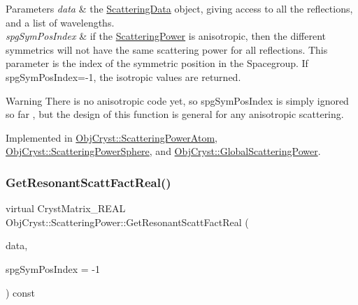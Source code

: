 \begin{DoxyParams}{Parameters}
{\em data} & the \mbox{\hyperlink{class_obj_cryst_1_1_scattering_data}{Scattering\+Data}} object, giving access to all the reflections, and a list of wavelengths. \\
\hline
{\em spg\+Sym\+Pos\+Index} & if the \mbox{\hyperlink{class_obj_cryst_1_1_scattering_power}{Scattering\+Power}} is anisotropic, then the different symmetrics will not have the same scattering power for all reflections. This parameter is the index of the symmetric position in the Spacegroup. If spg\+Sym\+Pos\+Index=-\/1, the isotropic values are returned. \\
\hline
\end{DoxyParams}
\begin{DoxyWarning}{Warning}
There is no anisotropic code yet, so spg\+Sym\+Pos\+Index is simply ignored so far , but the design of this function is general for any anisotropic scattering. 
\end{DoxyWarning}


Implemented in \mbox{\hyperlink{class_obj_cryst_1_1_scattering_power_atom_a42db6378fdd8e3fbfae31b3f4dd5bb17}{Obj\+Cryst\+::\+Scattering\+Power\+Atom}}, \mbox{\hyperlink{class_obj_cryst_1_1_scattering_power_sphere_a66b0eb24b24b92e6bbdf677c53853aad}{Obj\+Cryst\+::\+Scattering\+Power\+Sphere}}, and \mbox{\hyperlink{class_obj_cryst_1_1_global_scattering_power_af570597de2c717e60b63507745e32e32}{Obj\+Cryst\+::\+Global\+Scattering\+Power}}.

\mbox{\label{class_obj_cryst_1_1_scattering_power_a42c1302254787d13b9e0f2210315291a}} 
\subsubsection{\texorpdfstring{GetResonantScattFactReal()}{GetResonantScattFactReal()}}
{\footnotesize\ttfamily virtual Cryst\+Matrix\+\_\+\+R\+E\+AL Obj\+Cryst\+::\+Scattering\+Power\+::\+Get\+Resonant\+Scatt\+Fact\+Real (\begin{DoxyParamCaption}\item[{const \mbox{\hyperlink{class_obj_cryst_1_1_scattering_data}{Scattering\+Data}} \&}]{data,  }\item[{const int}]{spg\+Sym\+Pos\+Index = {\ttfamily -\/1} }\end{DoxyParamCaption}) const\hspace{0.3cm}{\ttfamily [pure virtual]}}



